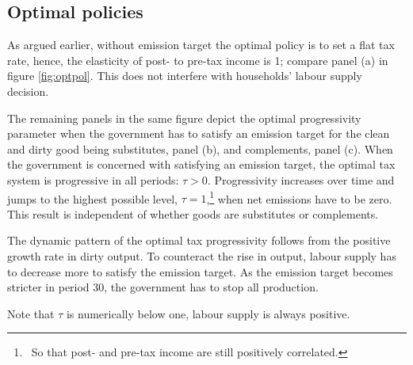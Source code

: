 \clearpage
\subsection{Optimal policies}
As argued earlier, without emission target the optimal policy is to set a flat tax rate, hence, the elasticity of post- to pre-tax income is 1; compare panel (a) in figure \ref{fig:optpol}. This does not interfere with households' labour supply decision.

The remaining panels in the same figure depict the optimal progressivity parameter when the government has to satisfy an emission target for the clean and dirty good being substitutes, panel (b), and complements, panel (c).
When the government is concerned with satisfying an emission target, the optimal tax system is progressive in all periods: $\tau >0$. Progressivity increases over time and jumps to the highest  possible level, $\tau=1$,\footnote{\ So that post- and pre-tax income are still positively correlated.} when net emissions have to be zero. This result is independent of whether goods are substitutes or complements.   

The dynamic pattern of the optimal tax progressivity follows from the positive growth rate in dirty output. To counteract the rise in output, labour supply has to decrease more to satisfy the emission target. As the emission target becomes stricter in period 30, the government has to stop all production. 

Note that $\tau$ is numerically below one, labour supply is always positive.

